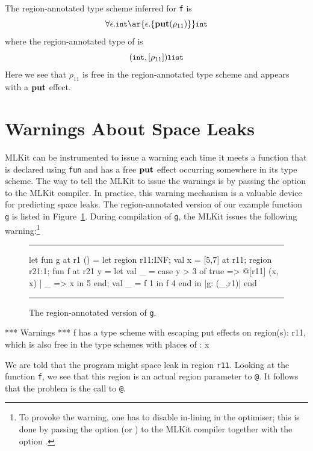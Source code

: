 \documentclass[12pt]{book}
\begin{document}
The region-annotated type scheme inferred for \lstinline{f} is
$$\forall\epsilon.\kw{int} \ar{\epsilon.\{\Put(\rho_{11})\}} \kw{int}$$ where
the region-annotated type of  is
$$(\mbox{\small\ttfamily int},[\rho_{11}])\mbox{\small\ttfamily list}$$ Here we see that $\rho_{11}$ is free in the
region-annotated type scheme and appears with a $\mathop{\bf put}\nolimits$ effect.

\section{Warnings About Space Leaks}
MLKit can be instrumented to issue a warning each time it meets a function
that is declared using \lstinline{fun} and has a free $\mathop{\bf put}\nolimits$ effect occurring
somewhere in its type scheme. The way to tell the MLKit to issue the warnings is
by passing the option
%
%
 to the MLKit compiler. In practice, this warning
mechanism is a valuable device for predicting space leaks.  The region-annotated
version of our example function \lstinline{g} is listed in
Figure~\ref{escape_mulexp.fig}. During compilation of \lstinline{g}, the MLKit issues
the following warning:\footnote{To provoke the warning, one has to disable
in-lining in the
%
%
{\Lam} optimiser; this is done by passing the option
 (or ) to the MLKit
compiler together with the option .}
\begin{figure}
\hrule
\medskip
\begin{smlcode}
   let fun g at r1 () =
           let region r11:INF;
               val x = [5,7] at r11;
               region r21:1;
               fun f at r21 y =
                   let val _ = case y > 3 of
                                 true => @[r11] (x, x)
                               | _ => x
                   in  5
                   end;
               val _ = f 1
           in  f 4
           end
   in  {|g: (_,r1)|}
   end
\end{smlcode}
\caption{The region-annotated version of \lstinline{g}.}
\medskip
\hrule
\label{escape_mulexp.fig}
\end{figure}
\begin{small}
\begin{scriptcode}
 *** Warnings ***
f has a type scheme with escaping put effects on region(s):
r11, which is also free in the type schemes with places of :  x
\end{scriptcode}
\end{small}
We are told that the program might space leak in region \lstinline{r11}.
Looking at the function \lstinline{f}, we see that this region is an actual
region parameter to \lstinline{@}. It follows that the problem is the call to
\lstinline{@}.
\end{document}
